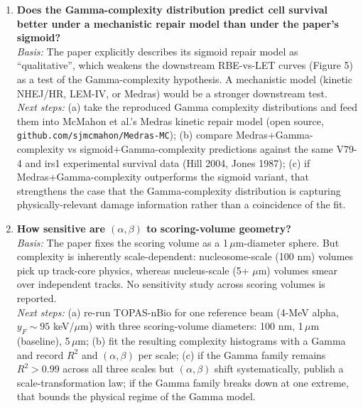 \begin{enumerate}
\item \textbf{Does the Gamma-complexity distribution predict cell survival
better under a mechanistic repair model than under the paper's sigmoid?} \\
\emph{Basis:} The paper explicitly describes its sigmoid repair model as
``qualitative'', which weakens the downstream RBE-vs-LET curves (Figure 5)
as a test of the Gamma-complexity hypothesis. A mechanistic model (kinetic
NHEJ/HR, LEM-IV, or Medras) would be a stronger downstream test. \\
\emph{Next steps:} (a) take the reproduced Gamma complexity distributions and
feed them into McMahon et al.'s Medras kinetic repair model (open source,
\texttt{github.com/sjmcmahon/Medras-MC}); (b) compare Medras+Gamma-complexity
vs sigmoid+Gamma-complexity predictions against the same V79-4 and irs1
experimental survival data (Hill 2004, Jones 1987); (c) if Medras+Gamma-complexity
outperforms the sigmoid variant, that strengthens the case that the
Gamma-complexity distribution is capturing physically-relevant damage
information rather than a coincidence of the fit.

\item \textbf{How sensitive are $(\alpha, \beta)$ to scoring-volume geometry?} \\
\emph{Basis:} The paper fixes the scoring volume as a 1\,$\mu$m-diameter
sphere. But complexity is inherently scale-dependent: nucleosome-scale
(100 nm) volumes pick up track-core physics, whereas nucleus-scale (5+ $\mu$m)
volumes smear over independent tracks. No sensitivity study across scoring
volumes is reported. \\
\emph{Next steps:} (a) re-run TOPAS-nBio for one reference beam
(4-MeV alpha, $y_F \sim 95$ keV/$\mu$m) with three scoring-volume diameters:
100 nm, 1\,$\mu$m (baseline), 5\,$\mu$m; (b) fit the resulting complexity
histograms with a Gamma and record $R^2$ and $(\alpha, \beta)$ per scale;
(c) if the Gamma family remains $R^2 > 0.99$ across all three scales but
$(\alpha, \beta)$ shift systematically, publish a scale-transformation law;
if the Gamma family breaks down at one extreme, that bounds the physical
regime of the Gamma model.


\end{enumerate}
